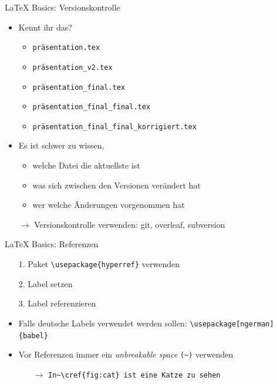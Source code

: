 \documentclass[main.tex]{subfiles}
\begin{document}
\begin{frame}[fragile]{\LaTeX{} Basics: Versionskontrolle}
    \begin{itemize}
        \item Kennt ihr das?
        \begin{itemize}
            \item \verb|präsentation.tex|
            \pause
            \item \verb|präsentation_v2.tex|
            \pause
            \item \verb|präsentation_final.tex|
            \pause
            \item \verb|präsentation_final_final.tex|
            \pause
            \item \verb|präsentation_final_final_korrigiert.tex|
        \end{itemize}
        \medskip
        \pause
        \item Es ist schwer zu wissen,
        \begin{itemize}
            \item welche Datei die aktuellste ist
            \item was sich zwischen den Versionen verändert hat
            \item wer welche Änderungen vorgenommen hat
        \end{itemize}
        \pause
        \medskip
        \item[$\to$] Versionskontrolle verwenden\pause: git\pause, overleaf\pause, subversion
    \end{itemize}

\end{frame}

\begin{frame}[fragile]{\LaTeX{} Basics: Referenzen}
    \begin{itemize}
        \item[1.] Paket \verb|\usepackage{hyperref}| verwenden
        \pause
        \item[2.] Label setzen
        \pause
        \item[3.] Label referenzieren
        \medskip
        \pause
        \item Falls deutsche Labels verwendet werden sollen: \verb|\usepackage[ngerman]{babel}|
        \pause
        \medskip
        \item Vor Referenzen immer ein \emph{unbreakable space} \verb|(~)| verwenden
        \begin{itemize}
            \item[$\to$] \verb|In~\cref{fig:cat} ist eine Katze zu sehen|
        \end{itemize}
    \end{itemize}
\end{frame}
\end{document}
